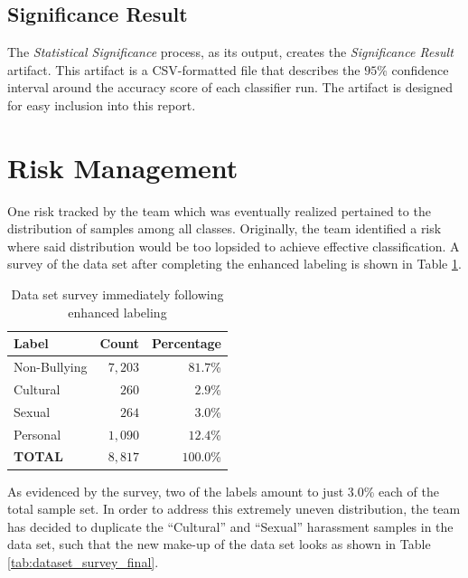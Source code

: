 \documentclass[conference]{sig-alternate-05-2015}
\begin{document}
\subsection{Significance Result}\label{subsec:stat_sig_result}
The \textit{Statistical Significance} process, as its output, creates the
\textit{Significance Result} artifact. This artifact is a CSV-formatted file
that describes the $95$\% confidence interval around the accuracy score of each
classifier run. The artifact is designed for easy inclusion into this report.

\section{Risk Management}\label{sec:expectations}

One risk tracked by the team which was eventually realized pertained to the
distribution of samples among all classes. Originally, the team identified a
risk where said distribution would be too lopsided to achieve effective
classification. A survey of the data set after completing the enhanced labeling
is shown in Table \ref{tab:dataset_survey_first}.

\begin{table}[h!]
  \centering
  \begin{tabular}{| l | r | r |}
    \hline
    Label & Count & Percentage \\
    \hline\hline
    Non-Bullying & $7,203$ & $81.7$\% \\
    \hline
    Cultural & $260$ & $2.9$\% \\
    \hline
    Sexual & $264$ & $3.0$\% \\
    \hline
    Personal & $1,090$ & $12.4$\% \\
    \hline\hline
    \textbf{TOTAL} & $8,817$ & $100.0$\% \\
    \hline
  \end{tabular}
  \caption{Data set survey immediately following enhanced labeling}
  \label{tab:dataset_survey_first}
\end{table}

As evidenced by the survey, two of the labels amount to just $3.0$\% each of the
total sample set. In order to address this extremely uneven distribution, the
team has decided to duplicate the ``Cultural'' and ``Sexual'' harassment samples
in the data set, such that the new make-up of the data set looks as shown in
Table \ref{tab:dataset_survey_final}.
\end{document}
